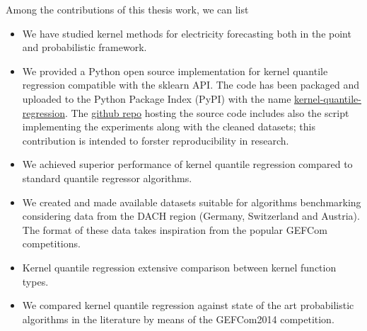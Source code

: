 Among the contributions of this thesis work, we can list
\begin{itemize}
    \item We have studied kernel methods for electricity forecasting both in the point and probabilistic framework.
    \item We provided a Python open source implementation for kernel quantile regression compatible with the sklearn API. The code has been packaged and uploaded to the Python Package Index (PyPI) with the name \href{https://pypi.org/project/kernel-quantile-regression/#2}{kernel-quantile-regression}. The \href{https://github.com/luca-pernigo/kernel_quantile_regression}{github repo} hosting the source code includes also the script implementing the experiments along with the cleaned datasets; this contribution is intended to forster reproducibility in research.
    \item We achieved superior performance of kernel quantile regression compared to standard quantile regressor algorithms. 
    \item We created and made available datasets suitable for algorithms benchmarking considering data from the DACH region (Germany, Switzerland and Austria). The format of these data takes inspiration from the popular GEFCom competitions.
    \item Kernel quantile regression extensive comparison between kernel function types.
    \item We compared kernel quantile regression against state of the art probabilistic algorithms in the literature by means of the GEFCom2014 competition.
\end{itemize}


